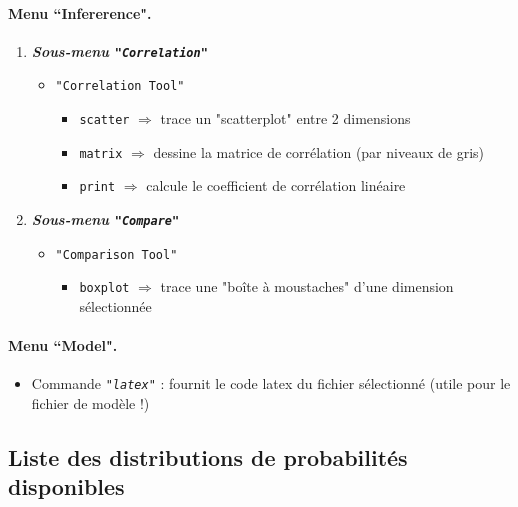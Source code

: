 \paragraph{Menu ``Infererence".}
\begin{enumerate}
\item \emph{\bf Sous-menu \texttt{"Correlation"}} 
\begin{itemize}
\item \texttt{"Correlation Tool"} 
\begin{itemize}
\item \scriptsize  \texttt{scatter} $\Rightarrow$ trace un "scatterplot" entre 2 dimensions
\item  \scriptsize  \texttt{matrix} $\Rightarrow$ dessine la matrice de corrélation (par niveaux de gris)
\item  \scriptsize  \texttt{print} $\Rightarrow$ calcule le coefficient de corrélation linéaire 
\end{itemize}
\end{itemize}
\item \emph{\bf Sous-menu \texttt{"Compare"}} 
\begin{itemize}
\item \texttt{"Comparison Tool"} 
\begin{itemize}
\item \scriptsize  \texttt{boxplot} $\Rightarrow$ trace une "boîte à moustaches" d'une dimension sélectionnée
\end{itemize}
\end{itemize}
\end{enumerate}

\paragraph{Menu ``Model".}
\begin{itemize}
\item Commande  \emph{\texttt{"latex"}} : fournit le code latex du fichier sélectionné (utile pour le fichier de modèle !)
\end{itemize}

\subsection{Liste des distributions de probabilités disponibles}

